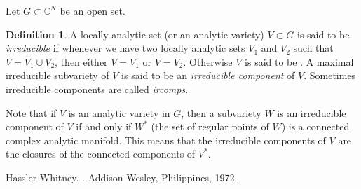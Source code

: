 \documentclass[12pt]{article}
\theoremstyle{definition}
\newtheorem*{defn}{Definition}
\theoremstyle{theorem}
\begin{document}
Let $G \subset {\mathbb{C}}^N$ be an open set.

\begin{defn}
A locally analytic set (or an analytic variety) $V \subset G$ is said to be {\em irreducible} if whenever we have two locally analytic sets $V_1$ and $V_2$ such that $V = V_1 \cup V_2$, then either $V = V_1$ or $V = V_2$.  Otherwise $V$ is
said to be {\em {}}.  A maximal irreducible subvariety of $V$ is said to be an {\em irreducible component} of $V$.  Sometimes irreducible components are
called {\em ircomps}.
\end{defn}

Note that if $V$ is an analytic variety in $G$, then a subvariety $W$ is an irreducible component of $V$ if and only if $W^*$ (the set of regular points of $W$) is a connected complex analytic manifold.  This means that the irreducible components of $V$ are the closures of the connected components of $V^*$.

\begin{thebibliography}{9}
Hassler Whitney.
{\em {}}.
Addison-Wesley, Philippines, 1972.
\end{thebibliography}
\end{document}
